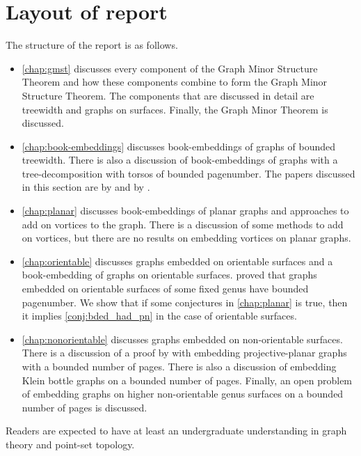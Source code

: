 \section{Layout of report}
The structure of the report is as follows.
\begin{itemize}
	\item \cref{chap:gmst} discusses every component of the Graph Minor Structure Theorem and how these components combine to form the Graph Minor Structure Theorem. The components that are discussed in detail are treewidth and graphs on surfaces. Finally, the Graph Minor Theorem is discussed.
	\item \cref{chap:book-embeddings} discusses book-embeddings of graphs of bounded treewidth. There is also a discussion of book-embeddings of graphs with a tree-decomposition with torsos of bounded pagenumber. The papers discussed in this section are by \textcite{hickingbothamStackNumberCliqueSum2023} and by \textcite{ganleyPagenumberTrees2001}. 
	\item \cref{chap:planar} discusses book-embeddings of planar graphs and approaches to add on vortices to the graph. There is a discussion of some methods to add on vortices, but there are no results on embedding vortices on planar graphs. 
	\item \cref{chap:orientable} discusses graphs embedded on orientable surfaces and a book-embedding of graphs on orientable surfaces. \textcite{heathPagenumberGenusGraphs1992} proved that graphs embedded on orientable surfaces of some fixed genus have bounded pagenumber. We show that if some conjectures in \cref{chap:planar} is true, then it implies \cref{conj:bded_had_pn} in the case of orientable surfaces. 
	\item \cref{chap:nonorientable} discusses graphs embedded on non-orientable surfaces. There is a discussion of a proof by \textcite{nakamotoBookEmbeddingProjectiveplanar2015} with embedding projective-planar graphs with a bounded number of pages. There is also a discussion of embedding Klein bottle graphs on a bounded number of pages. Finally, an open problem of embedding graphs on higher non-orientable genus surfaces on a bounded number of pages is discussed.
\end{itemize}

Readers are expected to have at least an undergraduate understanding in graph theory and point-set topology. 

